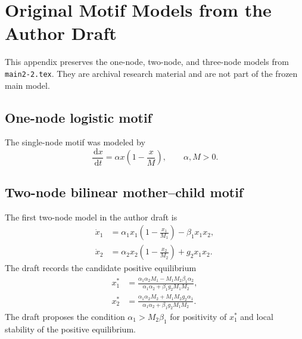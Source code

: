 \documentclass[11pt, reqno]{amsart}
\theoremstyle{definition}
\theoremstyle{remark}
\newcommand{\dd}{\,\mathrm{d}}
\begin{document}
\appendix

\section{Original Motif Models from the Author Draft}
\label{app:motifs}

This appendix preserves the one-node, two-node, and three-node models from
\texttt{main2-2.tex}.  They are archival research material and are not part of
the frozen main model.

\subsection{One-node logistic motif}

The single-node motif was modeled by
\begin{equation}
\label{eq:one-node-logistic}
    \frac{\dd x}{\dd t}
    =
    \alpha x\left(1-\frac{x}{M}\right),
    \qquad
    \alpha,M>0.
\end{equation}


\subsection{Two-node bilinear mother--child motif}

The first two-node model in the author draft is
\begin{equation}
\label{eq:two-node-bilinear}
\begin{aligned}
    \dot x_1
    &=
    \alpha_1x_1\left(1-\frac{x_1}{M_1}\right)
    -\beta_1x_1x_2,\\
    \dot x_2
    &=
    \alpha_2x_2\left(1-\frac{x_2}{M_2}\right)
    +g_2x_1x_2.
\end{aligned}
\end{equation}
The draft records the candidate positive equilibrium
\begin{equation}
\label{eq:two-node-equilibrium}
\begin{aligned}
    x_1^*
    &=
    \frac{
        \alpha_1\alpha_2M_1
        -M_1M_2\beta_1\alpha_2
    }{
        \alpha_1\alpha_2
        +\beta_1g_2M_1M_2
    },\\
    x_2^*
    &=
    \frac{
        \alpha_1\alpha_2M_2
        +M_1M_2g_2\alpha_1
    }{
        \alpha_1\alpha_2
        +\beta_1g_2M_1M_2
    }.
\end{aligned}
\end{equation}
The draft proposes the condition $\alpha_1>M_2\beta_1$ for positivity of
$x_1^*$ and local stability of the positive equilibrium.
\end{document}
